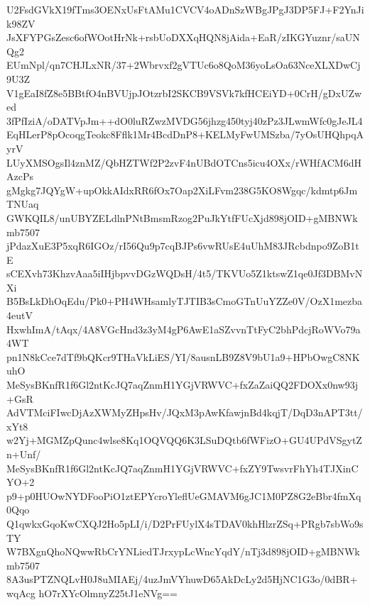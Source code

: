 U2FsdGVkX19fTms3OENxUsFtAMu1CVCV4oADnSzWBgJPgJ3DP5FJ+F2YnJik98ZV
JsXFYPGsZesc6ofWOotHrNk+rsbUoDXXqHQN8jAida+EaR/zIKGYuznr/saUNQg2
EUmNpl/qn7CHJLxNR/37+2Wbrvxf2gVTUc6o8QoM36yoLsOa63NceXLXDwCj9U3Z
V1gEaI8fZ8e5BBtfO4nBVUjpJOtzrbI2SKCB9VSVk7kfHCEiYD+0CrH/gDxUZwed
3fPfIziA/oDATVpJm++dO0luRZwzMVDG56jhzg450tyj40zPz3JLwmWfc0gJeJL4
EqHLerP8pOcoqgTeokc8Fflk1Mr4BcdDnP8+KELMyFwUMSzba/7yOsUHQhpqAyrV
LUyXMSOgsIl4znMZ/QbHZTWf2P2zvF4nUBdOTCns5icu4OXx/rWHfACM6dHAzcPs
gMgkg7JQYgW+upOkkAIdxRR6fOx7Oap2XiLFvm238G5KO8Wgqc/kdmtp6JmTNUaq
GWKQIL8/unUBYZELdlnPNtBmsmRzog2PuJkYtfFUcXjd898jOID+gMBNWkmb7507
jPdazXuE3P5xqR6IGOz/rI56Qu9p7cqBJPs6vwRUsE4uUhM83JRcbdnpo9ZoB1tE
sCEXvh73KhzvAaa5iIHjbpvvDGzWQDsH/4t5/TKVUo5Z1ktswZ1qe0Jf3DBMvNXi
B5BsLkDhOqEdu/Pk0+PH4WHsamlyTJTIB3sCmoGTnUuYZZe0V/OzX1mezba4eutV
HxwhImA/tAqx/4A8VGcHnd3z3yM4gP6AwE1aSZvvnTtFyC2bhPdcjRoWVo79a4WT
pn1N8kCce7dTf9bQKcr9THaVkLiES/YI/8ausnLB9Z8V9bU1a9+HPbOwgC8NKuhO
MeSysBKnfR1f6Gl2ntKcJQ7aqZnmH1YGjVRWVC+fxZaZaiQQ2FDOXx0nw93j+GsR
AdVTMciFIwcDjAzXWMyZHpsHv/JQxM3pAwKfawjnBd4kqjT/DqD3nAPT3tt/xYt8
w2Yj+MGMZpQunc4wlse8Kq1OQVQQ6K3LSuDQtb6fWFizO+GU4UPdVSgytZn+Unf/
MeSysBKnfR1f6Gl2ntKcJQ7aqZnmH1YGjVRWVC+fxZY9TwsvrFhYh4TJXinCYO+2
p9+p0HUOwNYDFooPiO1ztEPYcroYleflUeGMAVM6gJC1M0PZ8G2eBbr4fmXq0Qqo
Q1qwkxGqoKwCXQJ2Ho5pLI/i/D2PrFUylX4sTDAV0khHlzrZSq+PRgb7sbWo9sTY
W7BXgnQhoNQwwRbCrYNLiedTJrxypLcWncYqdY/nTj3d898jOID+gMBNWkmb7507
8A3usPTZNQLvH0J8uMIAEj/4uzJmVYhuwD65AkDcLy2d5HjNC1G3o/0dBR+wqAcg
hO7rXYcOlmnyZ25tJ1eNVg==
